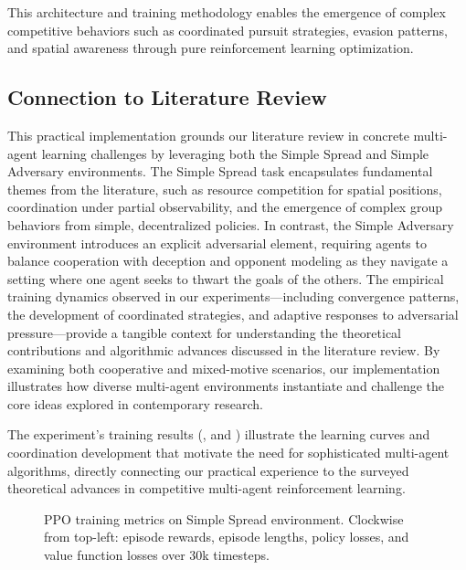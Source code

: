 \noindent
This architecture and training methodology enables the emergence of complex competitive behaviors such as coordinated pursuit strategies, evasion patterns, and spatial awareness through pure reinforcement learning optimization.

\subsection{Connection to Literature Review}

This practical implementation grounds our literature review in concrete multi-agent learning challenges by leveraging both the Simple Spread and Simple Adversary environments. The Simple Spread task encapsulates fundamental themes from the literature, such as resource competition for spatial positions, coordination under partial observability, and the emergence of complex group behaviors from simple, decentralized policies. In contrast, the Simple Adversary environment introduces an explicit adversarial element, requiring agents to balance cooperation with deception and opponent modeling as they navigate a setting where one agent seeks to thwart the goals of the others. The empirical training dynamics observed in our experiments—including convergence patterns, the development of coordinated strategies, and adaptive responses to adversarial pressure—provide a tangible context for understanding the theoretical contributions and algorithmic advances discussed in the literature review. By examining both cooperative and mixed-motive scenarios, our implementation illustrates how diverse multi-agent environments instantiate and challenge the core ideas explored in contemporary research.

The experiment's training results (,   and ) illustrate the learning curves and coordination development that motivate the need for sophisticated multi-agent algorithms, directly connecting our practical experience to the surveyed theoretical advances in competitive multi-agent reinforcement learning.

\begin{figure}[htpb]
    \centering
    
    \caption{PPO training metrics on Simple Spread environment. Clockwise from top-left: episode rewards, episode lengths, policy losses, and value function losses over 30k timesteps.}
    \label{fig:training_history}
\end{figure}

